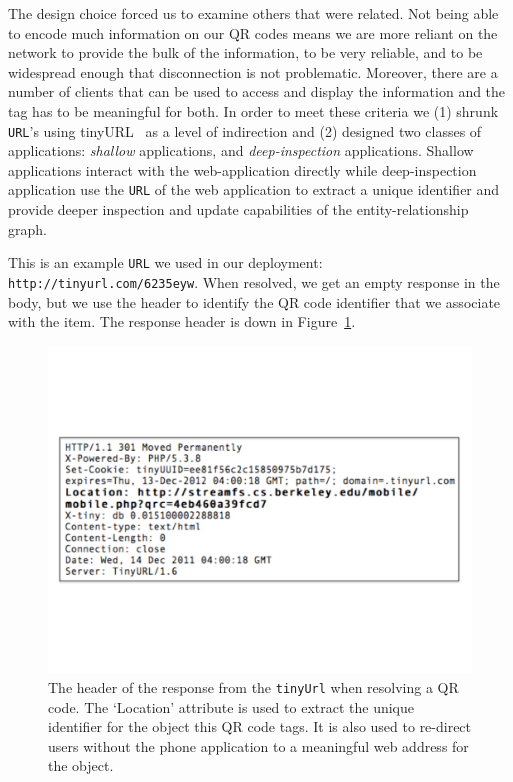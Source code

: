 The design choice forced us to examine others that were related.  Not being able to encode much information on 
our QR codes means we are more reliant on the network to provide the bulk of the information, to be very reliable,
and to be widespread enough that disconnection is not problematic.  Moreover, there are a number of clients
that can be used to access and display the information and the tag has to be meaningful for both.
In order to meet these criteria we (1) shrunk \texttt{URL}'s using tinyURL~\cite{tinyurl} as a level of 
indirection and 
(2) designed two classes of applications: \emph{shallow} applications, and \emph{deep-inspection} applications.  Shallow
applications interact with the web-application directly while deep-inspection application use
the \texttt{URL} of the web application to extract a unique identifier and provide deeper inspection
and update capabilities of the entity-relationship graph.

This is an example \texttt{URL} we used in our deployment: \texttt{http://tinyurl.com/6235eyw}.
When resolved, we get an empty response in the body, but we use the header to identify the QR code identifier 
that we associate with the item.  The response header is down in Figure~\ref{fig:tinyurlhdr}.

\begin{figure}[htb!]
\begin{center}
\includegraphics[scale=0.30]{figs/tinyurlhdr}
\caption{The header of the response from the \texttt{tinyUrl} when resolving a QR code.  The `Location' attribute
is used to extract the unique identifier for the object this QR code tags.  It is also used to re-direct
users without the phone application to a meaningful web address for the object.}
\label{fig:tinyurlhdr}
\end{center}
\end{figure}


